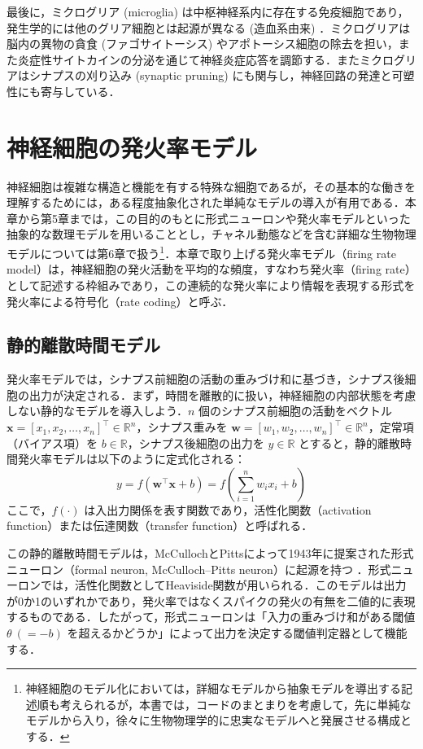 \documentclass[titlepage]{ltjsbook}
\begin{document}
最後に，ミクログリア (microglia) は中枢神経系内に存在する免疫細胞であり，発生学的には他のグリア細胞とは起源が異なる (造血系由来) ．ミクログリアは脳内の異物の貪食 (ファゴサイトーシス) やアポトーシス細胞の除去を担い，また炎症性サイトカインの分泌を通じて神経炎症応答を調節する．またミクログリアはシナプスの刈り込み (synaptic pruning) にも関与し，神経回路の発達と可塑性にも寄与している．

\section{神経細胞の発火率モデル}
神経細胞は複雑な構造と機能を有する特殊な細胞であるが，その基本的な働きを理解するためには，ある程度抽象化された単純なモデルの導入が有用である．本章から第5章までは，この目的のもとに形式ニューロンや発火率モデルといった抽象的な数理モデルを用いることとし，チャネル動態などを含む詳細な生物物理モデルについては第6章で扱う\footnote{神経細胞のモデル化においては，詳細なモデルから抽象モデルを導出する記述順も考えられるが，本書では，コードのまとまりを考慮して，先に単純なモデルから入り，徐々に生物物理学的に忠実なモデルへと発展させる構成とする．}．本章で取り上げる発火率モデル（firing rate model）は，神経細胞の発火活動を平均的な頻度，すなわち発火率（firing rate）として記述する枠組みであり，この連続的な発火率により情報を表現する形式を発火率による符号化（rate coding）と呼ぶ．

\subsection{静的離散時間モデル}
発火率モデルでは，シナプス前細胞の活動の重みづけ和に基づき，シナプス後細胞の出力が決定される．まず，時間を離散的に扱い，神経細胞の内部状態を考慮しない静的なモデルを導入しよう．$n$ 個のシナプス前細胞の活動をベクトル $\mathbf{x} = [x_1, x_2, \dots, x_n]^\top \in \mathbb{R}^n$，シナプス重みを $\mathbf{w} = [w_1, w_2, \dots, w_n]^\top \in \mathbb{R}^n$，定常項（バイアス項）を $b \in \mathbb{R}$，シナプス後細胞の出力を $y \in \mathbb{R}$ とすると，静的離散時間発火率モデルは以下のように定式化される：
\begin{equation}
y = f(\mathbf{w}^\top \mathbf{x} + b) = f\left(\sum_{i=1}^n w_i x_i + b\right)
\end{equation}
ここで，$f(\cdot)$ は入出力関係を表す関数であり，活性化関数（activation function）または伝達関数（transfer function）と呼ばれる．

この静的離散時間モデルは，McCullochとPittsによって1943年に提案された形式ニューロン（formal neuron, McCulloch–Pitts neuron）に起源を持つ \citep{mcculloch1943logical}．形式ニューロンでは，活性化関数としてHeaviside関数が用いられる．このモデルは出力が0か1のいずれかであり，発火率ではなくスパイクの発火の有無を二値的に表現するものである．したがって，形式ニューロンは「入力の重みづけ和がある閾値 $\theta \ (=-b)$ を超えるかどうか」によって出力を決定する閾値判定器として機能する．
\end{document}
